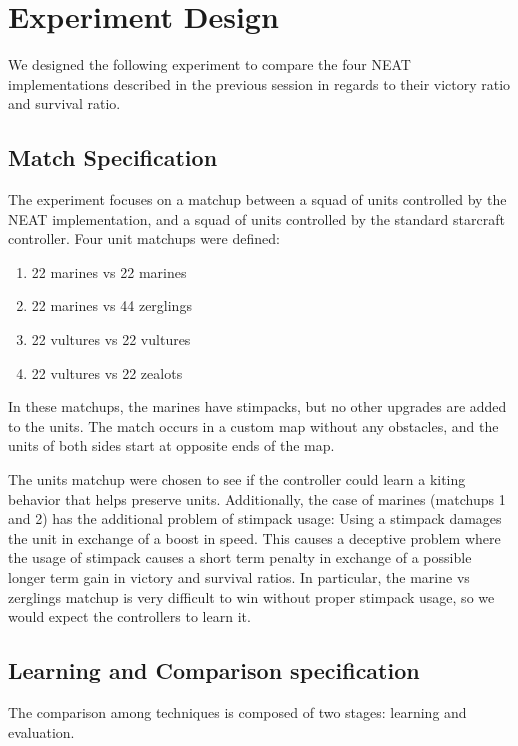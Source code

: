 \section{Experiment Design}

We designed the following experiment to compare the four NEAT
implementations described in the previous session in regards to their
victory ratio and survival ratio.

\subsection{Match Specification}

The experiment focuses on a matchup between a squad of units
controlled by the NEAT implementation, and a squad of units controlled
by the standard starcraft controller. Four unit matchups were defined:
\begin{enumerate}
    \item 22 marines vs 22 marines 
    \item 22 marines vs 44 zerglings 
    \item 22 vultures vs 22 vultures
    \item 22 vultures vs 22 zealots
\end{enumerate}
In these matchups, the marines have stimpacks, but no other upgrades
are added to the units. The match occurs in a custom map without any
obstacles, and the units of both sides start at opposite ends of the
map.

The units matchup were chosen to see if the controller could learn a
kiting behavior that helps preserve units. Additionally, the case of
marines (matchups 1 and 2) has the additional problem of stimpack
usage: Using a stimpack damages the unit in exchange of a boost in
speed. This causes a deceptive problem where the usage of stimpack
causes a short term penalty in exchange of a possible longer term gain
in victory and survival ratios. In particular, the marine vs zerglings
matchup is very difficult to win without proper stimpack usage, so we
would expect the controllers to learn it.

\subsection{Learning and Comparison specification}

The comparison among techniques is composed of two stages: learning
and evaluation.

